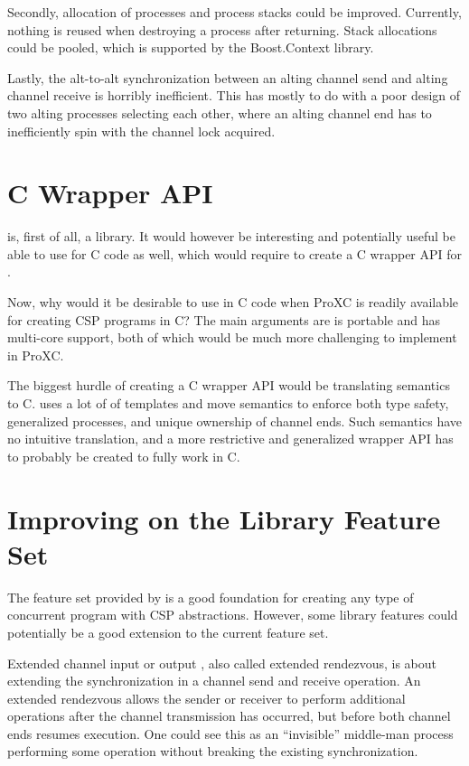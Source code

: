 Secondly, allocation of processes and process stacks could be improved. Currently, nothing is reused when destroying a process after returning. Stack allocations could be pooled, which is supported by the Boost.Context library. 

Lastly, the alt\hyp{}to\hyp{}alt synchronization between an alting channel send and alting channel receive is horribly inefficient. This has mostly to do with a poor design of two alting processes selecting each other, where an alting channel end has to inefficiently spin with the channel lock acquired.


\section{C Wrapper API}


\Proxc{} is, first of all, a \Cpp{} library. It would however be interesting and potentially useful be able to use \Proxc{} for C code as well, which would require to create a C wrapper API for \Proxc{}.

Now, why would it be desirable to use \Proxc{} in C code when ProXC is readily available for creating CSP programs in C? The main arguments are \Proxc{} is portable and has multi\hyp{}core support, both of which would be much more challenging to implement in ProXC.

The biggest hurdle of creating a C wrapper API would be translating \Cpp{} semantics to C. \Proxc{} uses a lot of of templates and move semantics to enforce both type safety, generalized processes, and unique ownership of channel ends. Such semantics have no intuitive translation, and a more restrictive and generalized wrapper API has to probably be created to fully work in C.


\section{Improving on the Library Feature Set}


The feature set provided by \Proxc{} is a good foundation for creating any type of concurrent program with CSP abstractions. However, some library features could potentially be a good extension to the current feature set.

Extended channel input or output \citep{carl2006extended}, also called extended rendezvous, is about extending the synchronization in a channel send and receive operation. An extended rendezvous allows the sender or receiver to perform additional operations after the channel transmission has occurred, but before both channel ends resumes execution. One could see this as an ``invisible'' middle\hyp{}man process performing some operation without breaking the existing synchronization.

